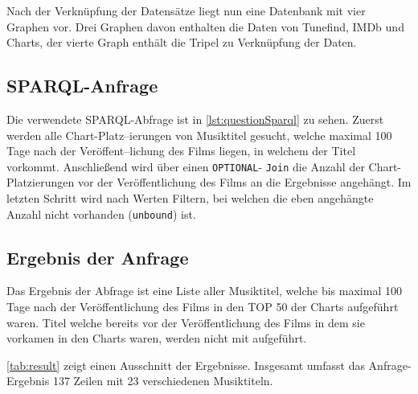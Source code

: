 \documentclass[parskip]{scrartcl}
\begin{document}
Nach der Verknüpfung der Datensätze liegt nun eine Datenbank mit vier Graphen vor. Drei Graphen davon enthalten die Daten von Tunefind, IMDb und Charts, der vierte Graph enthält die Tripel zu Verknüpfung der Daten.

\subsection{SPARQL-Anfrage}

Die verwendete SPARQL-Abfrage ist in \autoref{lst:questionSparql} zu sehen. Zuerst werden alle Chart-Platz--ierungen von Musiktitel gesucht, welche maximal 100 Tage nach der Veröffent--lichung des Films liegen, in welchem der Titel vorkommt. Anschließend wird über einen \texttt{OPTIONAL}- \texttt{Join} die Anzahl der Chart-Platzierungen vor der Veröffentlichung des Films an die Ergebnisse angehängt. Im letzten Schritt wird nach Werten Filtern, bei welchen die eben angehängte Anzahl nicht vorhanden (\texttt{unbound}) ist.

\subsection{Ergebnis der Anfrage} 

Das Ergebnis der Abfrage ist eine Liste aller Musiktitel, welche bis maximal 100 Tage nach der Veröffentlichung des Films in den TOP 50 der Charts aufgeführt waren. Titel welche bereits vor der Veröffentlichung des Films in dem sie vorkamen in den Charts waren, werden nicht mit aufgeführt.

\autoref{tab:result} zeigt einen Ausschnitt der Ergebnisse. Insgesamt umfasst das Anfrage-Ergebnis 137 Zeilen mit 23 verschiedenen Musiktiteln.
\end{document}
